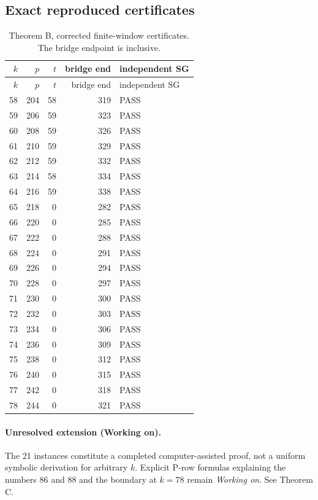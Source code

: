 \subsection{Exact reproduced certificates}
\begin{longtable}{rrrrl}
\caption{Theorem B, corrected finite-window certificates. The bridge endpoint is inclusive.}\label{tab:Bcert}\\
\toprule $k$ & $p$ & $t$ & bridge end & independent SG \\
\midrule\endfirsthead\toprule $k$ & $p$ & $t$ & bridge end & independent SG \\
\midrule\endhead
58 & 204 & 58 & 319 & PASS \\
59 & 206 & 59 & 323 & PASS \\
60 & 208 & 59 & 326 & PASS \\
61 & 210 & 59 & 329 & PASS \\
62 & 212 & 59 & 332 & PASS \\
63 & 214 & 58 & 334 & PASS \\
64 & 216 & 59 & 338 & PASS \\
65 & 218 & 0 & 282 & PASS \\
66 & 220 & 0 & 285 & PASS \\
67 & 222 & 0 & 288 & PASS \\
68 & 224 & 0 & 291 & PASS \\
69 & 226 & 0 & 294 & PASS \\
70 & 228 & 0 & 297 & PASS \\
71 & 230 & 0 & 300 & PASS \\
72 & 232 & 0 & 303 & PASS \\
73 & 234 & 0 & 306 & PASS \\
74 & 236 & 0 & 309 & PASS \\
75 & 238 & 0 & 312 & PASS \\
76 & 240 & 0 & 315 & PASS \\
77 & 242 & 0 & 318 & PASS \\
78 & 244 & 0 & 321 & PASS \\
\bottomrule\end{longtable}
\paragraph{Unresolved extension (Working on).} The 21 instances constitute a completed computer-assisted proof, not a uniform symbolic derivation for arbitrary $k$. Explicit P-row formulas explaining the numbers 86 and 88 and the boundary at $k=78$ remain \emph{Working on}. See Theorem C.
